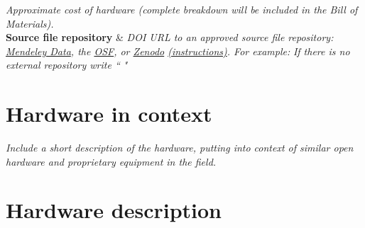 \documentclass[11pt, letterpaper]{article}
\begin{document}
\begin{flushleft}
\begin{tabu}
  \textit{Approximate cost of hardware (complete breakdown will be included in the Bill of Materials).}
  \\
\hline \textbf{Source file repository} & 
  \textit{DOI URL to an approved source file repository: \href{https://data.mendeley.com/}{Mendeley Data}, the \href{http://osf.io}{OSF}, or \href{https://zenodo.org/}{Zenodo} \href{https://doi.org/10.5281/zenodo.3346799}{(instructions)}. For example:}  \linebreak \linebreak
  \textit{If there is no external repository write “}  \textit{"}
\\\hline
\end{tabu}
\end{flushleft}

\section{Hardware in context}
\textit{Include a short description of the hardware, putting into context of similar open hardware and proprietary equipment in the field.}
\section{Hardware description}

\end{document}
